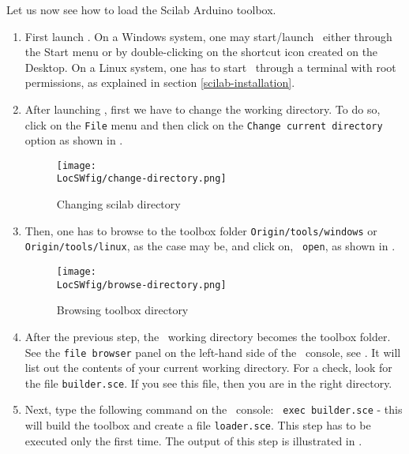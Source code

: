 Let us now see how to load the Scilab Arduino toolbox. 
\begin{enumerate}
      \item First launch \scilab. On a Windows system, one may start/launch
            \scilab\ either through the Start menu or by double-clicking on the
            shortcut icon created on the Desktop. On a Linux system, one has to
            start \scilab\ through a terminal with root permissions, as
            explained in section \ref{scilab-installation}.
      \item After launching \scilab, first we have to change the working
            directory. To do so, click on the {\tt File} menu and then click on
            the {\tt Change current directory} option as shown in
            .
            \begin{figure}
                  \centering
                  \texttt{[image: \\LocSWfig/change-directory.png]}
                  \caption{Changing scilab directory}
                  \label{scilab-cd}
            \end{figure}
      \item Then, one has to browse to the toolbox folder
                  {\tt Origin/tools/windows} or {\tt Origin/tools/linux}, as the case
            may be, and click on, {\tt
                        open}, as shown in .
            \begin{figure}
                  \centering
                  \texttt{[image: \\LocSWfig/browse-directory.png]}
                  \caption{Browsing toolbox directory}
                  \label{scilab-browse}
            \end{figure}
      \item After the previous step, the \scilab\ working directory becomes
            the toolbox folder.  See the {\tt file browser} panel on the
            left-hand side of the \scilab\ console, see .  It
            will list out the contents of your current working directory. For a
            check, look for the file {\tt builder.sce}.  If you see this file,
            then you are in the right directory.
      \item Next, type the following command on the \scilab\ console: {\tt
            exec builder.sce} - this will build the toolbox and create a file
                  {\tt loader.sce}. This step has to be executed only the first
            time. The output of this step is illustrated in .

\end{enumerate}
